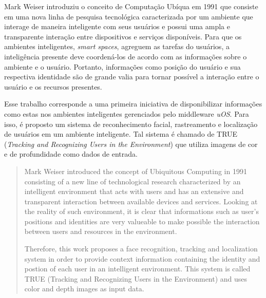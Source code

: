 \begin{resumo}

	Mark Weiser introduziu o conceito de Computação Ubíqua em 1991 que consiste em uma nova linha de pesquisa tecnológica caracterizada por um ambiente que interage de maneira inteligente com seus usuários e possui uma ampla e transparente interação entre dispositivos e serviços disponíveis. Para que os ambientes inteligentes, \textit{smart spaces}, agreguem as tarefas do usuários, a inteligência presente deve coordená-los de acordo com as informações sobre o ambiente e o usuário. Portanto, informações como posição do usuário e sua respectiva identidade são de grande valia para tornar possível a interação entre o usuário e os recursos presentes.

	Esse trabalho corresponde a uma primeira iniciativa de disponibilizar informações como estas nos ambientes inteligentes gerenciados pelo middleware \textit{uOS}. Para isso, é proposto um sistema de reconhecimento facial, rastreamento e localização de usuários em um ambiente inteligente. Tal sistema é chamado de TRUE (\textit{Tracking and Recognizing Users in the Environment}) que utiliza imagens de cor e de profundidade como dados de entrada.

\end{resumo}


\begin{abstract}
	
	Mark Weiser introduced the concept of Ubiquitous Computing in 1991 consisting of a new line of technological research characterized by an intelligent environment that acts with users and has an extensive and transparent interaction between available devices and services. Looking at the reality of such environment, it is clear that informations such as user's positions and identities are very valueable to make possible the interaction between users and resources in the environment.

	Therefore, this work proposes a face recognition, tracking and localization system in order to provide context information containing the identity and postion of each user in an intelligent environment. This system is called TRUE (Tracking and Recognizing Users in the Environment) and uses color and depth images as input data.

\end{abstract}

